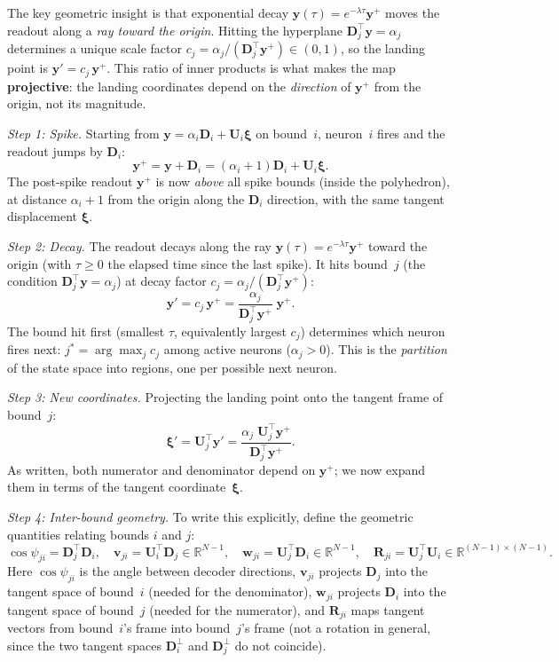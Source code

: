 \documentclass[12pt]{article}
\newcommand{\vv}[1]{\mathbf{#1}}
\newcommand{\DD}{\vv{D}}
\newcommand{\yy}{\vv{y}}
\newcommand{\xxi}{\boldsymbol{\xi}}
\newcommand{\RR}{\mathbb{R}}
\begin{document}
The key geometric insight is that exponential decay $\yy(\tau) = e^{-\lambda\tau}\yy^+$ moves the readout along a \emph{ray toward the origin}. Hitting the hyperplane $\DD_j^\top\yy = \alpha_j$ determines a unique scale factor $c_j = \alpha_j/(\DD_j^\top\yy^+) \in (0,1)$, so the landing point is $\yy' = c_j\,\yy^+$. This ratio of inner products is what makes the map \textbf{projective}: the landing coordinates depend on the \emph{direction} of $\yy^+$ from the origin, not its magnitude.

\emph{Step 1: Spike.} Starting from $\yy=\alpha_i\DD_i+\vv{U}_i\xxi$ on bound~$i$, neuron~$i$ fires and the readout jumps by $\DD_i$:
\begin{equation}\label{eq:post-spike}
    \yy^+ = \yy+\DD_i = (\alpha_i+1)\DD_i + \vv{U}_i\xxi.
\end{equation}
The post-spike readout $\yy^+$ is now \emph{above} all spike bounds (inside the polyhedron), at distance $\alpha_i+1$ from the origin along the $\DD_i$ direction, with the same tangent displacement $\xxi$.

 \emph{Step 2: Decay.} The readout decays along the ray $\yy(\tau)=e^{-\lambda\tau}\yy^+$ toward the origin (with $\tau\geq 0$ the elapsed time since the last spike). It hits bound~$j$ (the condition $\DD_j^\top\yy = \alpha_j$) at decay factor $c_j = \alpha_j/(\DD_j^\top\yy^+)$:
\begin{equation}\label{eq:decay}
    \yy' = c_j\,\yy^+ = \frac{\alpha_j}{\DD_j^\top\yy^+}\;\yy^+.
\end{equation}
The bound hit first (smallest $\tau$, equivalently largest $c_j$) determines which neuron fires next: $j^* = \arg\max_j c_j$ among active neurons ($\alpha_j > 0$). This is the \emph{partition} of the state space into regions, one per possible next neuron.

\emph{Step 3: New coordinates.} Projecting the landing point onto the tangent frame of bound~$j$:
\begin{equation}\label{eq:xiprime}
    \xxi' = \vv{U}_j^\top\yy' = \frac{\alpha_j\;\vv{U}_j^\top\yy^+}{\DD_j^\top\yy^+}.
\end{equation}
As written, both numerator and denominator depend on $\yy^+$; we now expand them in terms of the tangent coordinate~$\xxi$.

\emph{Step 4: Inter-bound geometry.} To write this explicitly, define the geometric quantities relating bounds $i$ and $j$:
\begin{equation}\label{eq:geometry}
    \cos\psi_{ji}=\DD_j^\top\DD_i,\quad
    \vv{v}_{ji}=\vv{U}_i^\top\DD_j\in\RR^{N-1},\quad
    \vv{w}_{ji}=\vv{U}_j^\top\DD_i\in\RR^{N-1},\quad
    \vv{R}_{ji}=\vv{U}_j^\top\vv{U}_i\in\RR^{(N-1)\times(N-1)}.
\end{equation}
Here $\cos\psi_{ji}$ is the angle between decoder directions, $\vv{v}_{ji}$ projects $\DD_j$ into the tangent space of bound~$i$ (needed for the denominator), $\vv{w}_{ji}$ projects $\DD_i$ into the tangent space of bound~$j$ (needed for the numerator), and $\vv{R}_{ji}$ maps tangent vectors from bound~$i$'s frame into bound~$j$'s frame (not a rotation in general, since the two tangent spaces $\DD_i^\perp$ and $\DD_j^\perp$ do not coincide).
\end{document}
